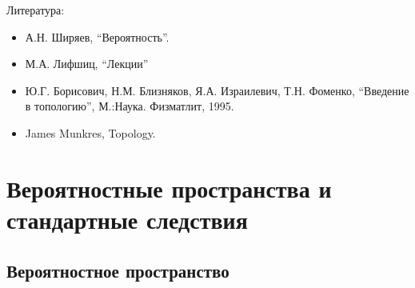 \documentclass[12pt,a4paper]{article}
\date{}
\begin{document}
    \maketitle

    \listoftodos[TODOs]

    \tableofcontents

    \vspace{2em}

    Литература:
    \begin{itemize}
        \item А.Н. Ширяев, ``Вероятность''.
        \item М.А. Лифшиц, ``Лекции''
        \item Ю.Г. Борисович, Н.М. Близняков, Я.А. Израилевич, Т.Н. Фоменко, ``Введение в топологию'', М.:Наука. Физматлит, 1995.
        \item James Munkres, Topology.
    \end{itemize}

    \section{Вероятностные пространства и стандартные следствия}

    \subsection{Вероятностное пространство}
\end{document}
